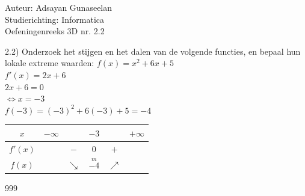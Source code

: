\documentclass[a4paper]{article}
\begin{document}
\noindent \large Auteur: Adsayan Gunaseelan \\
\noindent \large Studierichting: Informatica\\
\noindent \large Oefeningenreeks 3D nr. 2.2\\

\medskip

\normalsize

2.2) Onderzoek het stijgen en het dalen van de volgende functies, en bepaal hun lokale extreme waarden: $f(x)= x^2+6x +5$\\

$f'(x)= 2x+6$\\

$2x+6=0$\\

$\Leftrightarrow x=-3$\\

$f(-3) = (-3)^2+6(-3)+5 = -4$\\


\begin{tabular}{c|ccccc}
$x$ & $-\infty$ &  & $-3$ &  & $+\infty$\\ \hline
$f'(x)$ &  & $-$ & $0$ & $+$ &\\
$f(x)$ &  & $\searrow$ & $\overset{m}{-4}$ & $\nearrow$ &\\
\end{tabular}

\begin{thebibliography}{999}
\end{thebibliography}
\end{document}
